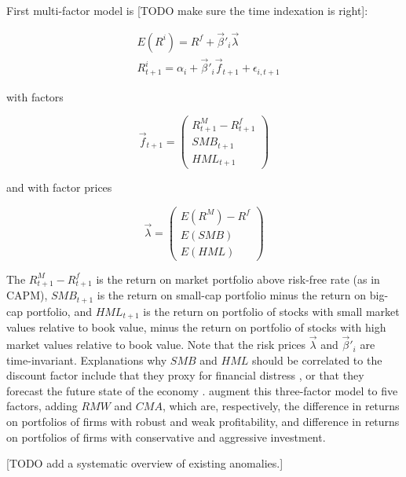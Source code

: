 			 First multi-factor model is \cite{fama1996multifactor} [TODO make sure the time indexation is right]:
			 
			 \begin{align}
			 	& E(R^i) = R^f + \vec{\beta}'_{i} \vec{\lambda} \\
			 	& R^i_{t+1} = \alpha_{i} + \vec{\beta}'_{i} \vec{f}_{t+1} + \epsilon_{i,t+1}
			 \end{align}
		 
		 	with factors  
			  		
				\begin{equation}
					\vec{f}_{t+1} = 
						\begin{pmatrix}
							R^M_{t+1}-R^f_{t+1} \\
							SMB_{t+1} \\
							HML_{t+1}				
						\end{pmatrix}
				\end{equation}
			
			and with factor prices 
			
			\begin{equation}
			  \vec{\lambda} =
				\begin{pmatrix}
					E(R^M)-R^f \\
					E(SMB) \\
					E(HML)				
				\end{pmatrix} 
			\end{equation}
			 
			The $R^M_{t+1}-R^f_{t+1}$ is the return on market portfolio above risk-free rate (as in CAPM), $SMB_{t+1}$ is the return on small-cap portfolio minus the return on big-cap portfolio, and $HML_{t+1}$ is the return on portfolio of stocks with small market values relative to book value, minus the return on portfolio of stocks with high market values relative to book value. Note that the risk prices $ \vec{\lambda}$ and $\vec{\beta}'_{i}$ are time-invariant. Explanations why $SMB$ and $HML$ should be correlated to the discount factor include that they proxy for financial distress \citep{fama1996multifactor}, \citep{heaton2000portfolio} or that they forecast the future state of the economy \citep{liew2000can}. 		
			\cite{fama2015five} augment this three-factor model to five factors, adding $RMW$ and $CMA$, which are, respectively, the difference in returns on portfolios of firms with robust and weak profitability, and difference in returns on portfolios of firms with conservative and aggressive investment. 
			
			[TODO add a systematic overview of existing anomalies.]
			

